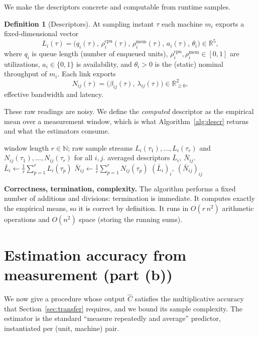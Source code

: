 \documentclass{amsart}
\theoremstyle{definition}
\newtheorem{definition}{Definition}
\newcommand{\Chat}{\widehat{C}}
\begin{document}
We make the descriptors concrete and computable from runtime samples.

\begin{definition}[Descriptors]\label{def:descriptors}
At sampling instant $\tau$ each machine $m_i$ exports a fixed-dimensional vector
\[
L_i(\tau)=\big(q_i(\tau),\, \rho^{\mathrm{cpu}}_i(\tau),\, \rho^{\mathrm{mem}}_i(\tau),\,
a_i(\tau),\, \theta_i\big)\in\mathbb{R}^{5},
\]
where $q_i$ is queue length (number of enqueued units), $\rho^{\mathrm{cpu}}_i,
\rho^{\mathrm{mem}}_i\in[0,1]$ are utilizations, $a_i\in\{0,1\}$ is availability,
and $\theta_i>0$ is the (static) nominal throughput of $m_i$. Each link exports
\[
N_{ij}(\tau)=\big(\beta_{ij}(\tau),\,\lambda_{ij}(\tau)\big)\in\mathbb{R}^2_{\ge0},
\]
effective bandwidth and latency.
\end{definition}

These raw readings are noisy. We define the \emph{computed} descriptor as the
empirical mean over a measurement window, which is what Algorithm~\ref{alg:descr}
returns and what the estimators consume.

\begin{algorithm}[h]
\caption{ComputeDescriptors}\label{alg:descr}
\begin{algorithmic}[1]
\Require window length $r\in\mathbb{N}$; raw sample streams $L_i(\tau_1),\dots,L_i(\tau_r)$ and $N_{ij}(\tau_1),\dots,N_{ij}(\tau_r)$ for all $i,j$.
\Ensure averaged descriptors $\bar L_i,\ \bar N_{ij}$.
  \State $\bar L_i \gets \frac{1}{r}\sum_{p=1}^{r} L_i(\tau_p)$
     \State $\bar N_{ij} \gets \frac{1}{r}\sum_{p=1}^{r} N_{ij}(\tau_p)$
  \EndFor
\EndFor
\State \Return $(\bar L_i)_i,\ (\bar N_{ij})_{ij}$
\end{algorithmic}
\end{algorithm}

\noindent\textbf{Correctness, termination, complexity.} The algorithm performs a
fixed number of additions and divisions: termination is immediate. It computes
exactly the empirical means, so it is correct by definition. It runs in
$O(r\,n^2)$ arithmetic operations and $O(n^2)$ space (storing the running sums).

\section{Estimation accuracy from measurement (part (b))}\label{sec:estimate}

We now give a procedure whose output $\Chat$ satisfies the multiplicative
accuracy that Section~\ref{sec:transfer} requires, and we bound its sample
complexity. The estimator is the standard ``measure repeatedly and average''
predictor, instantiated per (unit, machine) pair.
\end{document}
